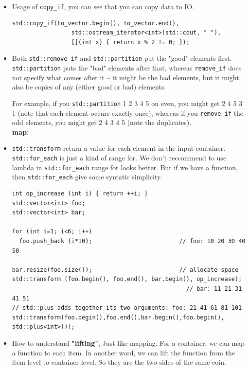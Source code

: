 \documentclass[a4paper,11pt,twoside]{book}
\begin{document}
\begin{itemize}
	\item Usage of \texttt{copy\_if}, you can see that you can copy data to IO.
\begin{lstlisting}
std::copy_if(to_vector.begin(), to_vector.end(),
                 std::ostream_iterator<int>(std::cout, " "),
                 [](int x) { return x % 2 != 0; });
\end{lstlisting}
	
	\item  Both \texttt{std::remove\_if} and \texttt{std::partition} put the "good" elements first. \texttt{std::partition} puts the "bad" elements after that, whereas \texttt{remove\_if} does not specify what comes after it -- it might be the bad elements, but it might also be copies of any (either good or bad) elements.
	
	For example, if you \texttt{std::partition} 1 2 3 4 5 on even, you might get 2 4 5 3 1 (note that each element occurs exactly once), whereas if you \texttt{remove\_if} the odd elements, you might get 2 4 3 4 5 (note the duplicates).
\\	
\textbf{map:}

	\item \texttt{std::transform} return a value for each element in the input container. \texttt{std::for\_each} is just a kind of range for. We don't reccommend to use lambda in \texttt{std::for\_each}  range for looks better.  But if we have a function, then \texttt{std::for\_each} give some syntatic simplicity. 
\begin{lstlisting}
int op_increase (int i) { return ++i; }
std::vector<int> foo;
std::vector<int> bar;

for (int i=1; i<6; i++)
  foo.push_back (i*10);                         // foo: 10 20 30 40 50

bar.resize(foo.size());                         // allocate space
std::transform (foo.begin(), foo.end(), bar.begin(), op_increase);
                                                  // bar: 11 21 31 41 51
// std::plus adds together its two arguments: foo: 21 41 61 81 101
std::transform(foo.begin(),foo.end(),bar.begin(),foo.begin(), std::plus<int>());
\end{lstlisting}

\item How to understand \textbf{"lifting"}, Just like mapping. For a container, we can map a function to each item. In another word, we can lift the function from the item level to container level. So they are the two sides of the same coin. 	
\end{itemize}
\end{document}
